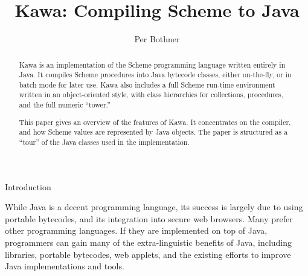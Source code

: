 \documentclass[twocolumn]{article}
\makeatletter
\def\affiliation#1{\gdef\@affiliation{{\it #1}}} \gdef\@affiliation{}
\def\section{\@startsection {section}{1}{\z@}
   {14pt plus 2pt minus 2pt}{12pt plus 2pt minus 2pt} {\large\bf}}
\newcommand{\LBr}{\char"7B}
\newcommand{\RBr}{\char"7D}
\newcommand{\UnTab}{\<}
\makeatother
\begin{document}
\title{Kawa:  Compiling Scheme to Java}
\author{Per Bothner}
\affiliation{Cygnus Solutions}
\maketitle

\thispagestyle{empty}
\begin{abstract}
Kawa is an implementation of the Scheme programming language
written entirely in Java.  It compiles Scheme procedures
into Java bytecode classes, either on-the-fly, or in
batch mode for later use.  Kawa also includes a full Scheme run-time
environment written in an object-oriented style, with class
hierarchies for collections, procedures, and the full numeric ``tower.''

This paper gives an overview of the features of Kawa.
It concentrates on the compiler, and how Scheme values are
represented by Java objects.  The paper is structured
as a ``tour'' of the Java classes used in the implementation.

\end{abstract}


\newcommand{\CHead}[2]%
  {{\parbox{\linewidth-\dimen\@curtab}
    {{\strut}#1\penalty-500{}#2{\strut}\rightskip=0pt plus3em\hangindent=3ex\hangafter=1}}}
\newcommand{\MHead}[3]{\CHead{#1 #2}{#3}}
\makeatother

\newcommand{\Comment}[1]{{\tt //} {\it #1}}

\newcommand{\TabSkip}{\kern2ex}
\newenvironment{Code}%
  {\begingroup\tt\frenchspacing\begin{tabbing}\TabSkip\=\TabSkip\=\TabSkip\=\TabSkip\=\TabSkip\=\kill}
  {\end{tabbing}\endgroup}

\newenvironment{ClassNoDots}[3]%
  {\begin{Code}#1 {\bf #2}#3 \LBr\+\\}
  {\UnTab\RBr\end{Code}}
\newenvironment{Class}[2]%
  {\begin{ClassNoDots}{class}{#1}{#2}}
  {...\\\end{ClassNoDots}}

\newcommand{\class}[1]{class {\bf #1}}

\section{Introduction}

While Java is a decent programming language, its success
is largely due to using portable bytecodes, and its
integration into secure web browsers.  Many prefer other
programming languages.  If they are implemented on top of
Java, programmers can gain many of the extra-linguistic
benefits of Java, including libraries, portable bytecodes,
web applets, and the existing efforts to improve Java
implementations and tools.
\end{document}
